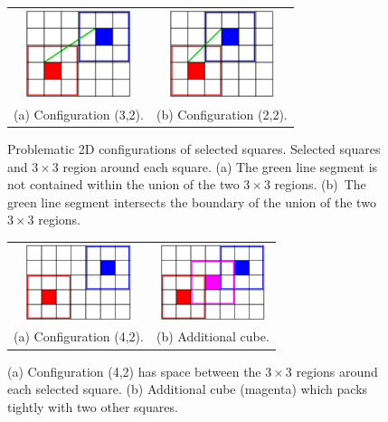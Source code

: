 \begin{figure}[t]
\centering
\begin{tabular}{cc}
\includegraphics[width=1.2in]{images/config2D_3_2.eps} \qquad &
\qquad
\includegraphics[width=1.2in]{images/config2D_2_2.eps} \\
(a) Configuration (3,2). & (b) Configuration (2,2).
\end{tabular}
\caption{Problematic 2D configurations of selected squares.
Selected squares and $3 \times 3$ region around each square.
(a) The green line segment is not contained within the union
of the two $3 \times 3$ regions.
(b)~The green line segment intersects the boundary
of the union of the two $3 \times 3$ regions.}
\label{fig:loose2D}
\end{figure}

\begin{figure}[t]
\centering
\begin{tabular}{cc}
\includegraphics[width=1.2in]{images/config2D_4_2.eps} \qquad &
\qquad
\includegraphics[width=1.2in]{images/config2D_4_2_B.eps} \\
(a) Configuration (4,2). & (b) Additional cube.
\end{tabular}
\caption{(a) Configuration (4,2) has space between the $3 \times 3$
regions around each selected square.
(b) Additional cube (magenta) which packs tightly with two other squares.}
\label{fig:config2D_4_2}
\end{figure}

